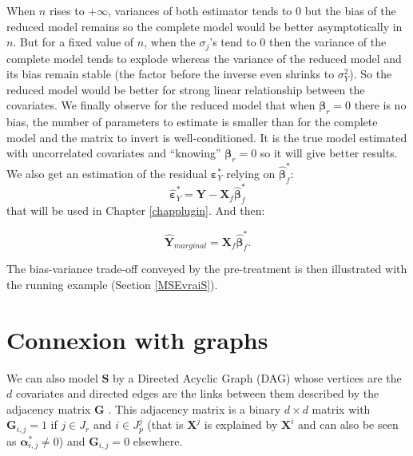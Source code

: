 \documentclass[12pt,a4paper]{report}
\begin{document}
When $n$ rises to $+\infty$, variances of both estimator tends to 0 but the bias of the reduced model remains so the complete model would be better asymptotically in $n$. But for a fixed value of $n$, when the $\sigma_j$'s tend to 0 then the variance of the complete model tends to explode whereas the variance of the reduced model and its bias remain stable (the factor before the inverse even shrinks to $\sigma_Y^2 $). So the reduced model would be better for strong linear relationship between the covariates. We finally observe for the reduced model that when $\boldsymbol{\beta}_r=0$ there is no bias, the number of parameters to estimate is smaller than for the complete model and the matrix to invert is well-conditioned. It is the true model estimated with uncorrelated covariates and ``knowing'' $\boldsymbol{\beta}_r=0$ so it will give better results.  \\	
	
 			We also get an estimation of the residual  $\boldsymbol{\varepsilon}_Y^*$ relying on $\hat{\boldsymbol{\beta}}^*_f$:
	\begin{equation}
		\hat{\boldsymbol{\varepsilon}}_Y^*=\boldsymbol{Y}-\boldsymbol{X}_f\hat{\boldsymbol{\beta}}^*_f \label{estimepsYstar}
	\end{equation}	
	that will be used in Chapter \ref{chapplugin}. And then:
		
	\begin{equation}
	\hat{\boldsymbol{Y}}_{marginal}=\boldsymbol{X}_f\hat{\boldsymbol{\beta}}_f^*. \nonumber %
	\end{equation}
	  
	The bias-variance trade-off conveyed by the pre-treatment is then illustrated with the running example (Section \ref{MSEvraiS}).
	

\section{Connexion with graphs}\label{sectiongraph}
	We can also model $\boldsymbol{S}$ by a Directed Acyclic Graph (DAG) whose vertices are the $d$ covariates and directed edges are the links  between them described by the adjacency matrix $\boldsymbol{G}$ \cite{bondy1976graph}. This adjacency matrix is a binary $d\times d$ matrix with $\boldsymbol{G}_{i,j}=1$ if $j\in J_r$ and $i \in J_p^j$ (that is $\boldsymbol{X}^j$ is explained by $\boldsymbol{X}^i$ and can also be seen as $\boldsymbol{\alpha}^*_{i,j}\neq 0$) and $\boldsymbol{G}_{i,j}=0$ elsewhere.\\
	
\end{document}
